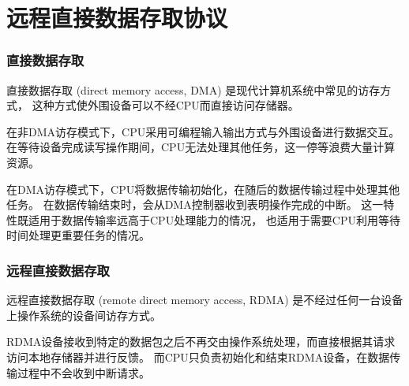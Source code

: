 \chapter{远程直接数据存取协议}
\subsection{直接数据存取}
直接数据存取 (direct memory access, DMA) 是现代计算机系统中常见的访存方式，
这种方式使外围设备可以不经CPU而直接访问存储器。

在非DMA访存模式下，CPU采用可编程输入输出方式与外围设备进行数据交互。
在等待设备完成读写操作期间，CPU无法处理其他任务，这一停等浪费大量计算资源。

在DMA访存模式下，CPU将数据传输初始化，在随后的数据传输过程中处理其他任务。
在数据传输结束时，会从DMA控制器收到表明操作完成的中断。
这一特性既适用于数据传输率远高于CPU处理能力的情况，
也适用于需要CPU利用等待时间处理更重要任务的情况。

\subsection{远程直接数据存取}
远程直接数据存取 (remote direct memory access, RDMA) 是不经过任何一台设备上操作系统的设备间访存方式。

RDMA设备接收到特定的数据包之后不再交由操作系统处理，而直接根据其请求访问本地存储器并进行反馈。
而CPU只负责初始化和结束RDMA设备，在数据传输过程中不会收到中断请求。
